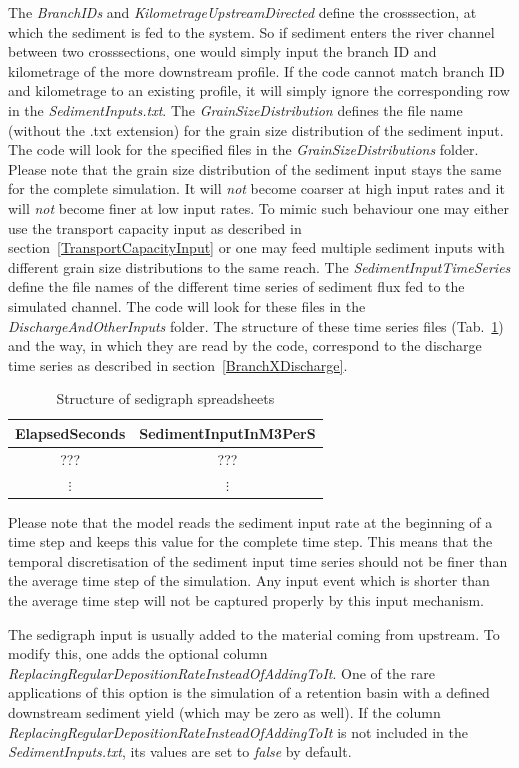 \documentclass[11pt,a4paper]{article}
\begin{document}
The \emph{BranchIDs} and \emph{KilometrageUpstreamDirected} define the crosssection, at which the sediment is fed to the system. So if sediment enters the river channel between two crosssections, one would simply input the branch ID and kilometrage of the more downstream profile. If the code cannot match branch ID and kilometrage to an existing profile, it will simply ignore the corresponding row in the \emph{SedimentInputs.txt}. The \emph{GrainSizeDistribution} defines the file name (without the .txt extension) for the grain size distribution of the sediment input. The code will look for the specified files in the \emph{GrainSizeDistributions} folder. Please note that the grain size distribution of the sediment input stays the same for the complete simulation. It will \emph{not} become coarser at high input rates and it will \emph{not} become finer at low input rates. To mimic such behaviour one may either use the transport capacity input as described in section~\ref{TransportCapacityInput} or one may feed multiple sediment inputs with different grain size distributions to the same reach. The \emph{SedimentInputTimeSeries} define the file names of the different time series of sediment flux fed to the simulated channel. The code will look for these files in the \emph{DischargeAndOtherInputs} folder. The structure of these time series files (Tab.~\ref{Sedigraph}) and the way, in which they are read by the code, correspond to the discharge time series as described in section~\ref{BranchXDischarge}.

\begin{table}[h]
\caption{Structure of sedigraph spreadsheets}
\label{Sedigraph}
\vskip4mm
\centering
\begin{tabular}{c|c}
\hline\hline
ElapsedSeconds & SedimentInputInM3PerS\\
\hline
??? & ???\\
\hline
$\vdots$ & $\vdots$\\
\hline\hline
\end{tabular}
\end{table}

Please note that the model reads the sediment input rate at the beginning of a time step and keeps this value for the complete time step. This means that the temporal discretisation of the sediment input time series should not be finer than the average time step of the simulation. Any input event which is shorter than the average time step will not be captured properly by this input mechanism.

The sedigraph input is usually added to the material coming from upstream. To modify this, one adds the optional column \emph{ReplacingRegularDepositionRateInsteadOfAddingToIt}. One of the rare applications of this option is the simulation of a retention basin with a defined downstream sediment yield (which may be zero as well). If the column \emph{ReplacingRegularDepositionRateInsteadOfAddingToIt} is not included in the \emph{SedimentInputs.txt}, its values are set to \emph{false} by default.
\end{document}
